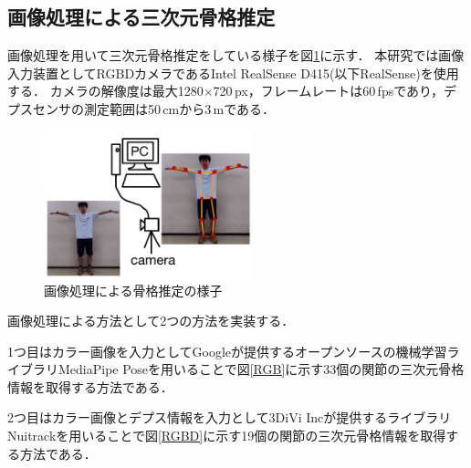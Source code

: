 \documentclass[titlepage]{jarticle}
\begin{document}
\subsection{画像処理による三次元骨格推定}\label{3Dskeleton}
画像処理を用いて三次元骨格推定をしている様子を図\ref{image_3D}に示す．
本研究では画像入力装置としてRGBDカメラであるIntel RealSense D415(以下RealSense)を使用する．
カメラの解像度は最大1280$\times$720\,px，フレームレートは60\,fpsであり，デプスセンサの測定範囲は50\,cmから3\,mである．
\begin{figure}[b]
  \centering
  \includegraphics[width=6cm]{img/image_3D.jpg}
  \caption{画像処理による骨格推定の様子}
  \label{image_3D}
\end{figure}

画像処理による方法として2つの方法を実装する．

1つ目はカラー画像を入力としてGoogleが提供するオープンソースの機械学習ライブラリMediaPipe Poseを用いることで図\ref{RGB}に示す33個の関節の三次元骨格情報を取得する方法である．

2つ目はカラー画像とデプス情報を入力として3DiVi Incが提供するライブラリNuitrackを用いることで図\ref{RGBD}に示す19個の関節の三次元骨格情報を取得する方法である．
\end{document}
